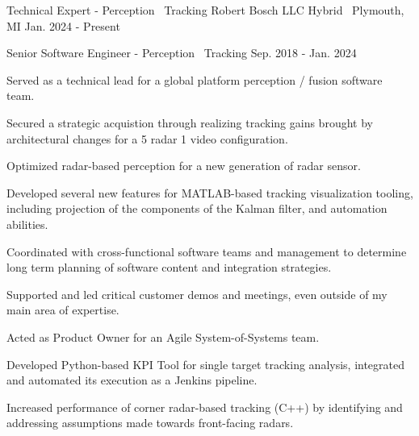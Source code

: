 

\begin{cventries}

  \cventry
    {Technical Expert - Perception \textbar\ Tracking} %
    {Robert Bosch LLC} %
    {Hybrid \textbar\ Plymouth, MI} %
    {Jan. 2024 - Present} %
    {
    }

  \cventrytitle
    {Senior Software Engineer - Perception \textbar\ Tracking} %
    {} %
    {} %
    {Sep. 2018 - Jan. 2024} %
    {
      \begin{cvitems} %
        \item {Served as a technical lead for a global platform perception / fusion software team.}
        \item {Secured a strategic acquistion through realizing tracking gains brought by architectural changes for a 5 radar 1 video configuration.}
        \item {Optimized radar-based perception for a new generation of radar sensor.}
        \item {Developed several new features for MATLAB-based tracking visualization tooling, including projection of the components of the Kalman filter, and automation abilities.}
        \item {Coordinated with cross-functional software teams and management to determine long term planning of software content and integration strategies.}
        \item {Supported and led critical customer demos and meetings, even outside of my main area of expertise.}
        \item {Acted as Product Owner for an Agile System-of-Systems team.}
        \item {Developed Python-based KPI Tool for single target tracking analysis, integrated and automated its execution as a Jenkins pipeline.}
        \item {Increased performance of corner radar-based tracking (C++) by identifying and addressing assumptions made towards front-facing radars.}

\end{cvitems}}
\end{cventries}
